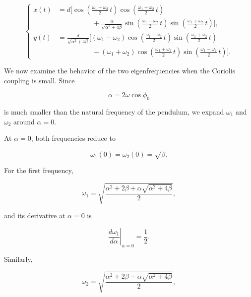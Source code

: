 \documentclass[12pt]{article}
\begin{document}
\begin{equation}
  \left\{
  \begin{aligned}
    x(t)
    &=
    d
    \Biggl[
      \cos\left(
        \frac{\omega_1-\omega_2}{2}\,t
      \right)
      \cos\left(
        \frac{\omega_1+\omega_2}{2}\,t
      \right)
      \\
      &\hspace{5em}
      +
      \frac{\alpha}{\sqrt{\alpha^2+4\beta}}
      \sin\left(
        \frac{\omega_1-\omega_2}{2}\,t
      \right)
      \sin\left(
        \frac{\omega_1+\omega_2}{2}\,t
      \right)
    \Biggr],
    \\[0.8em]
    y(t)
    &=
    \frac{d}{\sqrt{\alpha^2+4\beta}}
    \Biggl[
      (\omega_1-\omega_2)
      \cos\left(
        \frac{\omega_1-\omega_2}{2}\,t
      \right)
      \sin\left(
        \frac{\omega_1+\omega_2}{2}\,t
      \right)
      \\
      &\hspace{5em}
      -
      (\omega_1+\omega_2)
      \cos\left(
        \frac{\omega_1+\omega_2}{2}\,t
      \right)
      \sin\left(
        \frac{\omega_1-\omega_2}{2}\,t
      \right)
    \Biggr].
  \end{aligned}
  \right.
  \label{eq:foucault-sum-difference-solution}
\end{equation}

We now examine the behavior of the two eigenfrequencies when the Coriolis
coupling is small. Since

\[
  \alpha=2\omega\cos\phi_0
\]

is much smaller than the natural frequency of the pendulum, we expand
\(\omega_1\) and \(\omega_2\) around \(\alpha=0\).

At \(\alpha=0\), both frequencies reduce to

\[
  \omega_1(0)
  =
  \omega_2(0)
  =
  \sqrt{\beta}.
\]

For the first frequency,

\[
  \omega_1
  =
  \sqrt{
    \frac{
      \alpha^2
      +
      2\beta
      +
      \alpha\sqrt{\alpha^2+4\beta}
    }{2}
  },
\]

and its derivative at \(\alpha=0\) is

\[
  \left.
  \frac{d\omega_1}{d\alpha}
  \right|_{\alpha=0}
  =
  \frac{1}{2}.
\]

Similarly,

\[
  \omega_2
  =
  \sqrt{
    \frac{
      \alpha^2
      +
      2\beta
      -
      \alpha\sqrt{\alpha^2+4\beta}
    }{2}
  },
\]
\end{document}
